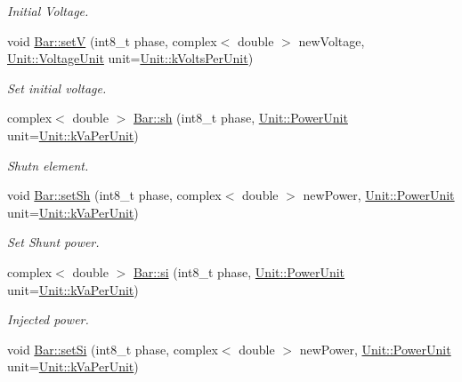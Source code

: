 \begin{DoxyCompactItemize}
\begin{DoxyCompactList}\small\item\em Initial Voltage. \end{DoxyCompactList}\item 
void \hyperlink{group___models_ga8d1e70b2d11ed4245e81b8b20858079d}{Bar\+::set\+V} (int8\+\_\+t phase, complex$<$ double $>$ new\+Voltage, \hyperlink{class_unit_a55b07dfa9457e1eca2c7194fe0cfc3c1}{Unit\+::\+Voltage\+Unit} unit=\hyperlink{class_unit_a55b07dfa9457e1eca2c7194fe0cfc3c1ab44b1310b59fdcdc9df5bbea91da4206}{Unit\+::k\+Volts\+Per\+Unit})
\begin{DoxyCompactList}\small\item\em Set initial voltage. \end{DoxyCompactList}\item 
complex$<$ double $>$ \hyperlink{group___models_gac020fff2f22a9caab71f21205b5773f8}{Bar\+::sh} (int8\+\_\+t phase, \hyperlink{class_unit_ace265ae255370ccacfd5370337572c3b}{Unit\+::\+Power\+Unit} unit=\hyperlink{class_unit_ace265ae255370ccacfd5370337572c3bae056e80d620a87c61a44c359e6b05cc1}{Unit\+::k\+Va\+Per\+Unit})
\begin{DoxyCompactList}\small\item\em Shutn element. \end{DoxyCompactList}\item 
void \hyperlink{group___models_gafd91c7f15566b9d5a68a197efeaeaf26}{Bar\+::set\+Sh} (int8\+\_\+t phase, complex$<$ double $>$ new\+Power, \hyperlink{class_unit_ace265ae255370ccacfd5370337572c3b}{Unit\+::\+Power\+Unit} unit=\hyperlink{class_unit_ace265ae255370ccacfd5370337572c3bae056e80d620a87c61a44c359e6b05cc1}{Unit\+::k\+Va\+Per\+Unit})
\begin{DoxyCompactList}\small\item\em Set Shunt power. \end{DoxyCompactList}\item 
complex$<$ double $>$ \hyperlink{group___models_ga9af07eb85c2c76eb3bc73e25bb842c1e}{Bar\+::si} (int8\+\_\+t phase, \hyperlink{class_unit_ace265ae255370ccacfd5370337572c3b}{Unit\+::\+Power\+Unit} unit=\hyperlink{class_unit_ace265ae255370ccacfd5370337572c3bae056e80d620a87c61a44c359e6b05cc1}{Unit\+::k\+Va\+Per\+Unit})
\begin{DoxyCompactList}\small\item\em Injected power. \end{DoxyCompactList}\item 
void \hyperlink{group___models_ga85e2a9b8a281900333fd65d1b532acfd}{Bar\+::set\+Si} (int8\+\_\+t phase, complex$<$ double $>$ new\+Power, \hyperlink{class_unit_ace265ae255370ccacfd5370337572c3b}{Unit\+::\+Power\+Unit} unit=\hyperlink{class_unit_ace265ae255370ccacfd5370337572c3bae056e80d620a87c61a44c359e6b05cc1}{Unit\+::k\+Va\+Per\+Unit})

\end{DoxyCompactItemize}
